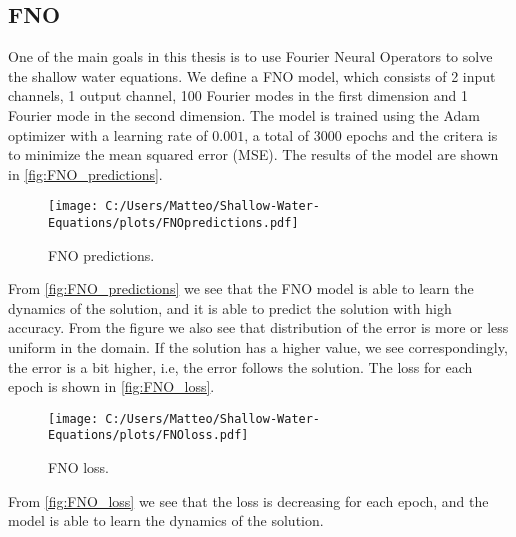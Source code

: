 \subsection{FNO}
One of the main goals in this thesis is to use Fourier Neural Operators to solve the shallow water equations.
We define a FNO model, which consists of 2 input channels, 1 output channel, 100 Fourier modes in the first dimension and 1 Fourier mode in the second dimension.
The model is trained using the Adam optimizer with a learning rate of $0.001$, a total of $3000$ epochs and the critera is to minimize the mean squared error (MSE).
The results of the model are shown in \autoref{fig:FNO_predictions}.
\begin{figure}[H]
    \centering
    \texttt{[image: C:/Users/Matteo/Shallow-Water-Equations/plots/FNOpredictions.pdf]}
    \caption{FNO predictions.}\label{fig:FNO_predictions}
\end{figure}
From \autoref{fig:FNO_predictions} we see that the FNO model is able to learn the dynamics of the solution, and it is able to predict the solution with high accuracy.
From the figure we also see that distribution of the error is more or less uniform in the domain. If the solution has a higher value, we see correspondingly, the error is a bit higher, i.e, the error follows the solution.
The loss for each epoch is shown in \autoref{fig:FNO_loss}.
\begin{figure}[H]
    \centering
    \texttt{[image: C:/Users/Matteo/Shallow-Water-Equations/plots/FNOloss.pdf]}
    \caption{FNO loss.}\label{fig:FNO_loss}
\end{figure}
From \autoref{fig:FNO_loss} we see that the loss is decreasing for each epoch, and the model is able to learn the dynamics of the solution.


